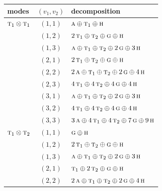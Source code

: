 \documentclass[11pt]{article}
\newcommand{\irr}[1]{\text{\normalfont\scshape #1}}
\begin{document}
\begin{longtable}{p{} c p{}}\hline modes & $(v_1,v_2)$ & decomposition\\ \hline\endhead

$\irr{t}_{1}\otimes \irr{t}_{1}$ & $(1,1)$ & $\irr{a}\oplus \irr{t}_{1}\oplus \irr{h}$\\

 & $(1,2)$ & $2\,\irr{t}_{1}\oplus \irr{t}_{2}\oplus \irr{g}\oplus \irr{h}$\\

 & $(1,3)$ & $\irr{a}\oplus \irr{t}_{1}\oplus \irr{t}_{2}\oplus 2\,\irr{g}\oplus 3\,\irr{h}$\\

 & $(2,1)$ & $2\,\irr{t}_{1}\oplus \irr{t}_{2}\oplus \irr{g}\oplus \irr{h}$\\

 & $(2,2)$ & $2\,\irr{a}\oplus \irr{t}_{1}\oplus \irr{t}_{2}\oplus 2\,\irr{g}\oplus 4\,\irr{h}$\\

 & $(2,3)$ & $4\,\irr{t}_{1}\oplus 4\,\irr{t}_{2}\oplus 4\,\irr{g}\oplus 4\,\irr{h}$\\

 & $(3,1)$ & $\irr{a}\oplus \irr{t}_{1}\oplus \irr{t}_{2}\oplus 2\,\irr{g}\oplus 3\,\irr{h}$\\

 & $(3,2)$ & $4\,\irr{t}_{1}\oplus 4\,\irr{t}_{2}\oplus 4\,\irr{g}\oplus 4\,\irr{h}$\\

 & $(3,3)$ & $3\,\irr{a}\oplus 4\,\irr{t}_{1}\oplus 4\,\irr{t}_{2}\oplus 7\,\irr{g}\oplus 9\,\irr{h}$\\

\hline

$\irr{t}_{1}\otimes \irr{t}_{2}$ & $(1,1)$ & $\irr{g}\oplus \irr{h}$\\

 & $(1,2)$ & $2\,\irr{t}_{1}\oplus \irr{t}_{2}\oplus \irr{g}\oplus \irr{h}$\\

 & $(1,3)$ & $\irr{a}\oplus \irr{t}_{1}\oplus \irr{t}_{2}\oplus 2\,\irr{g}\oplus 3\,\irr{h}$\\

 & $(2,1)$ & $\irr{t}_{1}\oplus 2\,\irr{t}_{2}\oplus \irr{g}\oplus \irr{h}$\\

 & $(2,2)$ & $2\,\irr{a}\oplus \irr{t}_{1}\oplus \irr{t}_{2}\oplus 2\,\irr{g}\oplus 4\,\irr{h}$\\


\end{longtable}
\end{document}

